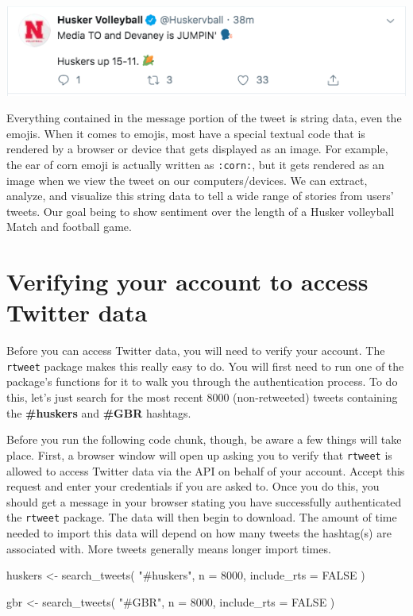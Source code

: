 \documentclass[
]{book}
\newenvironment{Shaded}{\begin{snugshade}}{\end{snugshade}}
\newcommand{\AttributeTok}[1]{\textcolor[rgb]{0.77,0.63,0.00}{#1}}
\newcommand{\ConstantTok}[1]{\textcolor[rgb]{0.00,0.00,0.00}{#1}}
\newcommand{\DecValTok}[1]{\textcolor[rgb]{0.00,0.00,0.81}{#1}}
\newcommand{\FunctionTok}[1]{\textcolor[rgb]{0.00,0.00,0.00}{#1}}
\newcommand{\NormalTok}[1]{#1}
\newcommand{\OtherTok}[1]{\textcolor[rgb]{0.56,0.35,0.01}{#1}}
\newcommand{\StringTok}[1]{\textcolor[rgb]{0.31,0.60,0.02}{#1}}
\begin{document}
\includegraphics[width=7.53in]{images/volleyballTweet}

Everything contained in the message portion of the tweet is string data, even the emojis. When it comes to emojis, most have a special textual code that is rendered by a browser or device that gets displayed as an image. For example, the ear of corn emoji is actually written as \texttt{:corn:}, but it gets rendered as an image when we view the tweet on our computers/devices. We can extract, analyze, and visualize this string data to tell a wide range of stories from users' tweets. Our goal being to show sentiment over the length of a Husker volleyball Match and football game.

\hypertarget{verifying-your-account-to-access-twitter-data}{%
\section{Verifying your account to access Twitter data}\label{verifying-your-account-to-access-twitter-data}}

Before you can access Twitter data, you will need to verify your account. The \texttt{rtweet} package makes this really easy to do. You will first need to run one of the package's functions for it to walk you through the authentication process. To do this, let's just search for the most recent 8000 (non-retweeted) tweets containing the \textbf{\#huskers} and \textbf{\#GBR} hashtags.

Before you run the following code chunk, though, be aware a few things will take place. First, a browser window will open up asking you to verify that \texttt{rtweet} is allowed to access Twitter data via the API on behalf of your account. Accept this request and enter your credentials if you are asked to. Once you do this, you should get a message in your browser stating you have successfully authenticated the \texttt{rtweet} package. The data will then begin to download. The amount of time needed to import this data will depend on how many tweets the hashtag(s) are associated with. More tweets generally means longer import times.

\begin{Shaded}
\begin{Highlighting}[]
\NormalTok{huskers }\OtherTok{\textless{}{-}} \FunctionTok{search\_tweets}\NormalTok{(}
  \StringTok{"\#huskers"}\NormalTok{, }\AttributeTok{n =} \DecValTok{8000}\NormalTok{, }\AttributeTok{include\_rts =} \ConstantTok{FALSE}
\NormalTok{)}

\NormalTok{gbr }\OtherTok{\textless{}{-}} \FunctionTok{search\_tweets}\NormalTok{(}
  \StringTok{"\#GBR"}\NormalTok{, }\AttributeTok{n =} \DecValTok{8000}\NormalTok{, }\AttributeTok{include\_rts =} \ConstantTok{FALSE}
\NormalTok{)}
\end{Highlighting}
\end{Shaded}
\end{document}
